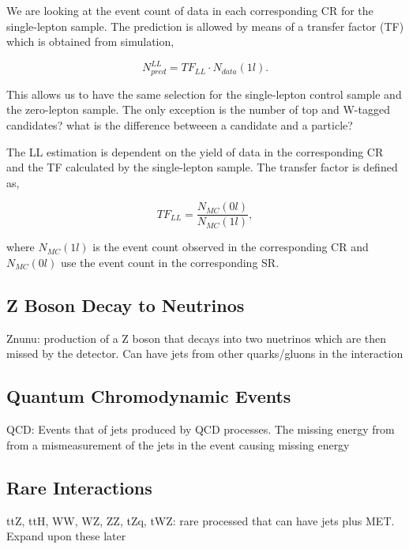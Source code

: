 We are looking at the event count of data in each corresponding CR for the single-lepton sample. The prediction is allowed by means of a transfer factor (TF) which is obtained from simulation,

\begin{equation}
\label{eqn:LLTF}
N_{pred}^{LL}=TF_{LL} \cdot N_{data}(1l).
\end{equation}

This allows us to have the same selection for the single-lepton control sample and the zero-lepton sample. The only exception is the number of top and W-tagged candidates? what is the difference betweeen a candidate and a particle?

The LL estimation is dependent on the yield of data in the corresponding CR and the TF calculated by the single-lepton sample. The transfer factor is defined as, 

\begin{equation}
\label{eqn:TF}
TF_{LL}=\frac{N_{MC}(0l)}{N_{MC}(1l)},
\end{equation}

where $N_{MC}(1l)$ is the event count observed in the corresponding CR and $N_{MC}(0l)$ use the event count in the corresponding SR. 






\subsection{Z Boson Decay to Neutrinos}
\label{subsec:Znunu}

Znunu: production of a Z boson that decays into two nuetrinos which are then missed by the detector. Can have jets from other quarks/gluons in the interaction

\subsection{Quantum Chromodynamic Events}
\label{subsec:QCD}

QCD: Events that of jets produced by QCD processes. The missing energy from from a mismeasurement of the jets in the event causing missing energy

\subsection{Rare Interactions}
\label{subsec:rare}

ttZ, ttH, WW, WZ, ZZ, tZq, tWZ: rare processed that can have jets plus MET. Expand upon these later
